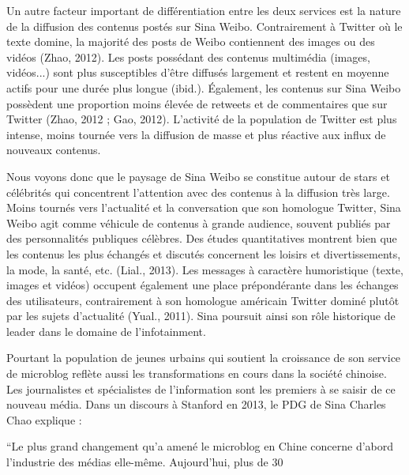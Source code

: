 Un autre facteur important de différentiation entre les deux services est la nature de la diffusion des contenus postés sur Sina Weibo. Contrairement à Twitter où le texte domine, la majorité des posts de Weibo contiennent des images ou des vidéos (Zhao, 2012). Les posts possédant des contenus multimédia (images, vidéos...) sont plus susceptibles d’être diffusés largement et restent en moyenne actifs pour une durée plus longue (ibid.). Également, les contenus sur Sina Weibo possèdent une proportion moins élevée de retweets et de commentaires que sur Twitter (Zhao, 2012 ; Gao, 2012). L’activité de la population de Twitter est plus intense, moins tournée vers la diffusion de masse et plus réactive aux influx de nouveaux contenus. 

Nous voyons donc que le paysage de Sina Weibo se constitue autour de stars et célébrités qui concentrent l’attention avec des contenus à la diffusion très large. Moins tournés vers l’actualité et la conversation que son homologue Twitter, Sina Weibo agit comme véhicule de contenus à grande audience, souvent publiés par des personnalités publiques célèbres. Des études quantitatives montrent bien que les contenus les plus échangés et discutés concernent les loisirs et divertissements, la mode, la santé, etc. (Lial., 2013). Les messages à caractère humoristique (texte, images et vidéos) occupent également une place prépondérante dans les échanges des utilisateurs, contrairement à son homologue américain Twitter dominé plutôt par les sujets d’actualité (Yual., 2011). Sina poursuit ainsi son rôle historique de leader dans le domaine de l’infotainment. 

Pourtant la population de jeunes urbains qui soutient la croissance de son service de microblog reflète aussi les transformations en cours dans la société chinoise. Les journalistes et spécialistes de l’information sont les premiers à se saisir de ce nouveau média. Dans un discours à Stanford en 2013, le PDG de Sina Charles Chao explique : 

“Le plus grand changement qu’a amené le microblog en Chine concerne d’abord l’industrie des médias elle-même. Aujourd’hui, plus de 30%

